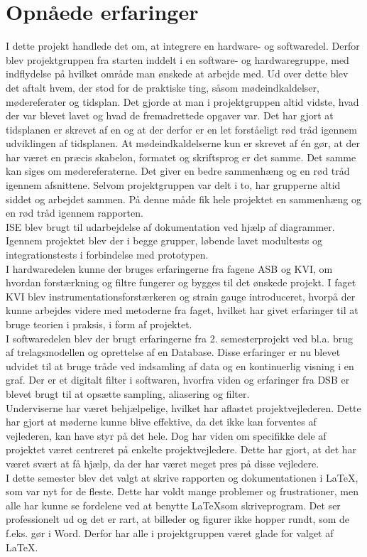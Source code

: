 \section{Opnåede erfaringer}
I dette projekt handlede det om, at integrere en hardware- og softwaredel. Derfor blev projektgruppen fra starten inddelt i en software- og hardwaregruppe, med indflydelse på hvilket område man ønskede at arbejde med. Ud over dette blev det aftalt hvem, der stod for de praktiske ting, såsom mødeindkaldelser, mødereferater og tidsplan. Det gjorde at man i projektgruppen altid vidste, hvad der var blevet lavet og hvad de fremadrettede opgaver var. Det har gjort at tidsplanen er skrevet af en og at der derfor er en let forståeligt rød tråd igennem udviklingen af tidsplanen. At mødeindkaldelserne kun er skrevet af én gør, at der har været en præcis skabelon, formatet og skriftsprog er det samme. Det samme kan siges om mødereferaterne. Det giver en bedre sammenhæng og en rød tråd igennem afsnittene.  
Selvom projektgruppen var delt i to, har grupperne altid siddet og arbejdet sammen. På denne måde fik hele projektet en sammenhæng og en rød tråd igennem rapporten. \\
ISE blev brugt til udarbejdelse af dokumentation ved hjælp af diagrammer. Igennem projektet blev der i begge grupper, løbende lavet modultests og integrationstests i forbindelse med prototypen.\\
I hardwaredelen kunne der bruges erfaringerne fra fagene ASB og KVI, om hvordan forstærkning og filtre fungerer og bygges til det ønskede projekt. I faget KVI blev instrumentationsforstærkeren og strain gauge introduceret, hvorpå der kunne arbejdes videre med metoderne fra faget, hvilket har givet erfaringer til at bruge teorien i praksis, i form af projektet.\\
I softwaredelen blev der brugt erfaringerne fra 2. semesterprojekt ved bl.a. brug af trelagsmodellen og oprettelse af en Database. Disse erfaringer er nu blevet udvidet til at bruge tråde ved indsamling af data og en kontinuerlig visning i en graf. Der er et digitalt filter i softwaren, hvorfra viden og erfaringer fra DSB er blevet brugt til at opsætte sampling, aliasering og filter.\\
Underviserne har været behjælpelige, hvilket har aflastet projektvejlederen. Dette har gjort at møderne kunne blive effektive, da det ikke kan forventes af vejlederen, kan have styr på det hele. Dog har viden om specifikke dele af projektet været centreret på enkelte projektvejledere. Dette har gjort, at det har været svært at få hjælp, da der har været meget pres på disse vejledere. \\
I dette semester blev det valgt at skrive rapporten og dokumentationen i \LaTeX, som var nyt for de fleste. Dette har voldt mange problemer og frustrationer, men alle har kunne se fordelene ved at benytte \LaTeX som skriveprogram. Det ser professionelt ud og det er rart, at billeder og figurer ikke hopper rundt, som de f.eks. gør i Word. Derfor har alle i projektgruppen været glade for valget af \LaTeX. \\

